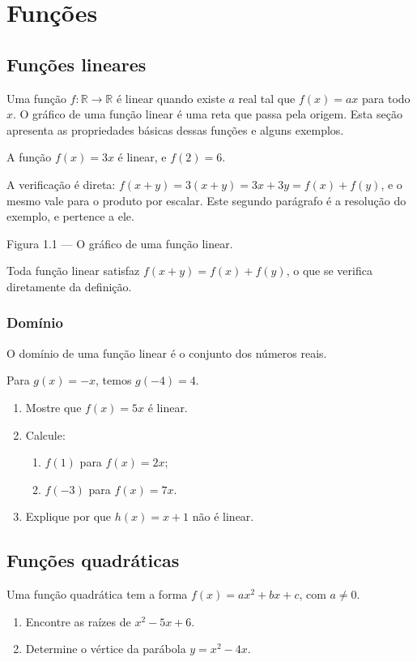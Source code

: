 \documentclass[11pt,oneside]{book}
\begin{document}
\chapter{Funções}
\section{Funções lineares}
Uma função $f\colon \mathbb{R}\to\mathbb{R}$ é linear quando existe $a$ real tal que
$f(x) = ax$ para todo $x$. O gráfico de uma função linear é uma reta que passa pela origem.
Esta seção apresenta as propriedades básicas dessas funções e alguns exemplos.

\begin{exemplo}
A função $f(x) = 3x$ é linear, e $f(2) = 6$.

A verificação é direta: $f(x+y) = 3(x+y) = 3x + 3y = f(x) + f(y)$, e o mesmo vale
para o produto por escalar. Este segundo parágrafo é a resolução do exemplo, e
pertence a ele.
\end{exemplo}

\begin{center}

Figura 1.1 --- O gráfico de uma função linear.
\end{center}

Toda função linear satisfaz $f(x+y) = f(x) + f(y)$, o que se verifica diretamente da definição.

\subsection{Domínio}
O domínio de uma função linear é o conjunto dos números reais.

\begin{exemplo}
Para $g(x) = -x$, temos $g(-4) = 4$.
\end{exemplo}

\blocoexercicios
\begin{enumerate}[label=\textbf{\arabic*.}]
\item Mostre que $f(x) = 5x$ é linear.
\item Calcule:
  \begin{enumerate}
  \item $f(1)$ para $f(x) = 2x$;
  \item $f(-3)$ para $f(x) = 7x$.
  \end{enumerate}
\item Explique por que $h(x) = x + 1$ não é linear.
\end{enumerate}

\section{Funções quadráticas}
Uma função quadrática tem a forma $f(x) = ax^2 + bx + c$, com $a \neq 0$.

\blocoexercicios
\begin{enumerate}[label=\textbf{\arabic*.}]
\item Encontre as raízes de $x^2 - 5x + 6$.
\item Determine o vértice da parábola $y = x^2 - 4x$.
\end{enumerate}
\end{document}
